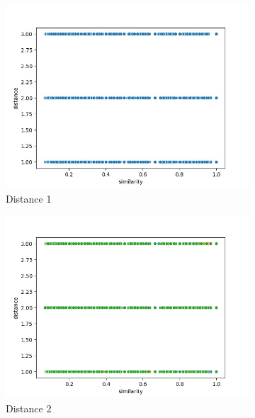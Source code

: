 \documentclass{article}
\begin{document}
\begin{figure}[H]
    \centering
    \begin{subfigure}[b]{0.3\textwidth}
        \includegraphics[width=\textwidth]{img/scatter_plot1.jpg}
        \caption{Distance 1}
        \label{fig:scatter_plot_1}
    \end{subfigure}
    \hfill
    \begin{subfigure}[b]{0.3\textwidth}
        \includegraphics[width=\textwidth]{img/scatter_plot2.png}
        \caption{Distance 2}
        \label{fig:scatter_plot_2}
    \end{subfigure}
    \hfill
    \begin{subfigure}[b]{0.3\textwidth}

\end{subfigure}
\end{figure}
\end{document}
